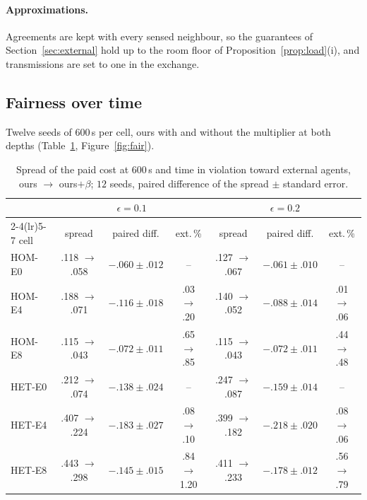 \documentclass[11pt]{article}
\theoremstyle{definition}
\theoremstyle{remark}
\begin{document}
\paragraph{Approximations.} Agreements are kept with every sensed neighbour, so the guarantees of Section~\ref{sec:external} hold up to the room floor of Proposition~\ref{prop:load}(i), and transmissions are set to one in the exchange.

\subsection{Fairness over time}\label{sec:fairnum}
Twelve seeds of $600$\,s per cell, ours with and without the multiplier at both depths (Table~\ref{tab:fair}, Figure~\ref{fig:fair}).

\begin{table}[h]
\centering\footnotesize\setlength{\tabcolsep}{4pt}
\begin{tabular}{lcccccc}
\toprule
 & \multicolumn{3}{c}{$\epsilon=0.1$} & \multicolumn{3}{c}{$\epsilon=0.2$}\\
\cmidrule(lr){2-4}\cmidrule(lr){5-7}
cell & spread & paired diff. & ext.\,\% & spread & paired diff. & ext.\,\%\\
\midrule
HOM-E0 & .118 $\to$ .058 & $-.060\pm.012$ & -- & .127 $\to$ .067 & $-.061\pm.010$ & --\\
HOM-E4 & .188 $\to$ .071 & $-.116\pm.018$ & .03 $\to$ .20 & .140 $\to$ .052 & $-.088\pm.014$ & .01 $\to$ .06\\
HOM-E8 & .115 $\to$ .043 & $-.072\pm.011$ & .65 $\to$ .85 & .115 $\to$ .043 & $-.072\pm.011$ & .44 $\to$ .48\\
HET-E0 & .212 $\to$ .074 & $-.138\pm.024$ & -- & .247 $\to$ .087 & $-.159\pm.014$ & --\\
HET-E4 & .407 $\to$ .224 & $-.183\pm.027$ & .08 $\to$ .10 & .399 $\to$ .182 & $-.218\pm.020$ & .08 $\to$ .06\\
HET-E8 & .443 $\to$ .298 & $-.145\pm.015$ & .84 $\to$ 1.20 & .411 $\to$ .233 & $-.178\pm.012$ & .56 $\to$ .79\\
\bottomrule
\end{tabular}
\caption{Spread of the paid cost at $600$\,s and time in violation toward external agents, ours $\to$ ours$+\beta$; $12$ seeds, paired difference of the spread $\pm$ standard error.}
\label{tab:fair}
\end{table}
\end{document}
